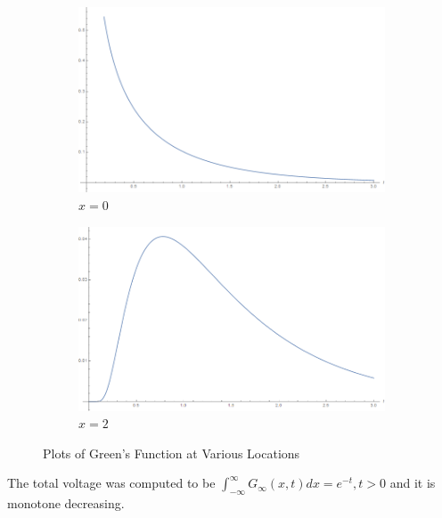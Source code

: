\documentclass[12pt]{article}
\begin{document}
\begin{figure}[H]
    \centering
    \begin{subfigure}[h]{0.4\textwidth}
        \includegraphics[width=\textwidth]{Part1Plots/x0}
        \caption{$x=0$}
        \label{fig:x0}
    \end{subfigure}
    \begin{subfigure}[h]{0.4\textwidth}
        \includegraphics[width=\textwidth]{Part1Plots/x2}
        \caption{$x=2$}
        \label{fig:x2}
    \end{subfigure}

    \caption{Plots of Green's Function at Various Locations}\label{fig:spaceplots}
\end{figure}

The total voltage was computed to be $\int_{-\infty}^{\infty}G_{\infty}(x,t)dx = e^{-t}, t>0$ and it is monotone decreasing.
\end{document}
